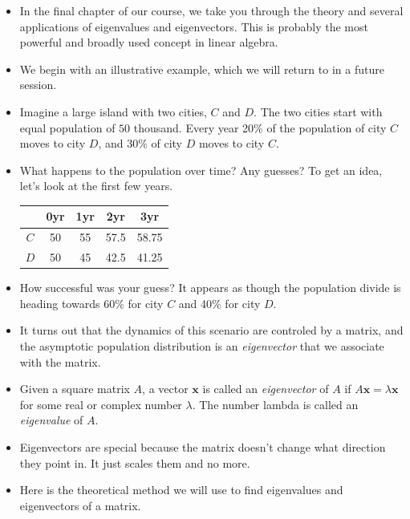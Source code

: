 \documentclass[11pt,oneside]{amsbook}
\theoremstyle{definition}
\theoremstyle{plain}
\theoremstyle{definition}
\theoremstyle{remark}
\numberwithin{equation}{section}
\numberwithin{figure}{section}
\begin{document}
\begin{itemize}
\item In the final chapter of our course, we take you through the theory and several applications of eigenvalues and eigenvectors. This is probably the most powerful and broadly used concept in linear algebra.
\item We begin with an illustrative example, which we will return to in a future session.
\item Imagine a large island with two cities, $C$ and $D$. The two cities start with equal population of $50$ thousand. Every year 20\% of the population of city $C$ moves to city $D$, and 30\% of city $D$ moves to city $C$.
  \begin{center}
  \end{center}
\item What happens to the population over time? Any guesses? To get an idea, let's look at the first few years.
  \begin{center}
    \begin{tabular}{ccccc}
       & 0yr & 1yr & 2yr & 3yr \\\hline
      $C$ & 50 & 55 & 57.5 & 58.75 \\
      $D$ & 50 & 45 & 42.5 & 41.25
    \end{tabular}
  \end{center}
\item How successful was your guess? It appears as though the population divide is heading towards 60\% for city $C$ and 40\% for city $D$.
\item It turns out that the dynamics of this scenario are controled by a matrix, and the asymptotic population distribution is an \emph{eigenvector} that we associate with the matrix.
\item Given a square matrix $A$, a vector $\mathbf{x}$ is called an \emph{eigenvector} of $A$ if $A\mathbf{x}=\lambda\mathbf{x}$ for some real or complex number $\lambda$. The number lambda is called an \emph{eigenvalue} of $A$.
\item Eigenvectors are special because the matrix doesn't change what direction they point in. It just scales them and no more.
\item Here is the theoretical method we will use to find eigenvalues and eigenvectors of a matrix.

\end{itemize}
\end{document}
